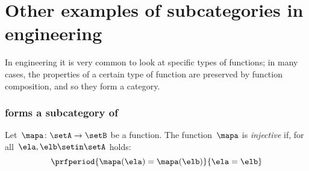 
\section[Other examples]{Other examples of subcategories in engineering}

In engineering it is very common to look at specific types of functions; in many cases, the properties of a certain type of function are preserved by function composition, and so they form a category.

\subsubsection{\Injset forms a subcategory of \Set}
\begin{definition}
    \label{def:injective-function}
    Let~$\mapa \colon \setA\to \setB$ be a function.
    The function~$\mapa$ is \emph{injective} if, for all~$\ela,\elb\setin \setA$ holds:
    \begin{equation*}
        \prfperiod{\mapa(\ela)=\mapa(\elb)}{\ela=\elb}
    \end{equation*}
\end{definition}

